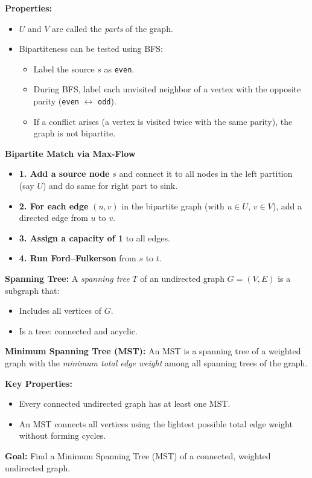 \documentclass[a4paper,landscape]{article}
\begin{document}
\begin{multicols}{7}
\textbf{Properties:}
\begin{itemize}[noitemsep, topsep=0pt]
    \item $U$ and $V$ are called the \textit{parts} of the graph.
    \item Bipartiteness can be tested using BFS:
    \begin{itemize}[noitemsep, topsep=0pt]
        \item Label the source $s$ as \texttt{even}.
        \item During BFS, label each unvisited neighbor of a vertex with the opposite parity (\texttt{even} $\leftrightarrow$ \texttt{odd}).
        \item If a conflict arises (a vertex is visited twice with the same parity), the graph is not bipartite.
    \end{itemize}
\end{itemize}
 \textbf{Bipartite Match via Max-Flow}
\begin{itemize}
  \item \textbf{1. Add a source node} $s$ and connect it to all nodes in the left partition (say $U$) and do same for right part to sink.
  \item \textbf{2. For each edge} $(u, v)$ in the bipartite graph (with $u \in U$, $v \in V$), add a directed edge from $u$ to $v$.
  \item \textbf{3. Assign a capacity of 1} to all edges.
  \item \textbf{4. Run Ford–Fulkerson} from $s$ to $t$.
\end{itemize}
\endtcolorbox

\tcolorbox[mybox={Spanning Trees}]
\textbf{Spanning Tree:}  
A \emph{spanning tree} $T$ of an undirected graph $G = (V, E)$ is a subgraph that:
\begin{itemize}[noitemsep, topsep=0pt]
    \item Includes all vertices of $G$.
    \item Is a tree: connected and acyclic.
\end{itemize}

\textbf{Minimum Spanning Tree (MST):}  
An MST is a spanning tree of a weighted graph with the \emph{minimum total edge weight} among all spanning trees of the graph.

\textbf{Key Properties:}
\begin{itemize}[noitemsep, topsep=0pt]
    \item Every connected undirected graph has at least one MST.
    \item An MST connects all vertices using the lightest possible total edge weight without forming cycles.
\end{itemize}
\endtcolorbox
\tcolorbox[mybox={Prim’s Algorithm}]
\textbf{Goal:} Find a Minimum Spanning Tree (MST) of a connected, weighted undirected graph.


\end{multicols}
\end{document}
